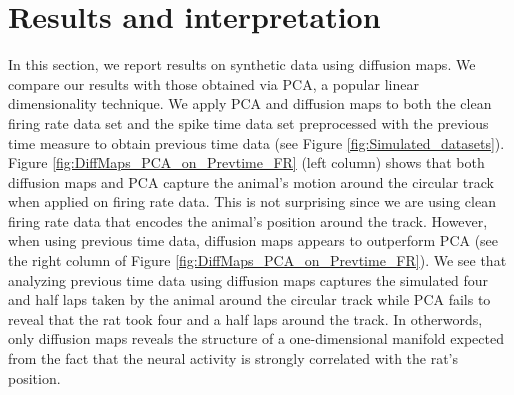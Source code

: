 
\section{Results and interpretation}
In this section, we report results on  synthetic data using diffusion maps. We compare our results with those obtained via PCA, a popular linear dimensionality technique. We apply PCA and diffusion maps to both the 
clean firing rate data set and the spike time data set preprocessed  with the previous time measure to obtain previous time data (see Figure \ref{fig:Simulated_datasets}).\\

Figure \ref{fig:DiffMaps_PCA_on_Prevtime_FR} (left column) shows that both diffusion maps  and PCA capture the animal's motion around the circular track when applied on firing rate data. This is not surprising since we are using clean firing rate data that encodes the animal's position around the track. However, when using previous time data, diffusion maps  appears to outperform PCA (see the right column of Figure  \ref{fig:DiffMaps_PCA_on_Prevtime_FR}). We  see that analyzing previous time data using diffusion maps captures the simulated four and half laps taken by the animal around the circular track while PCA  fails to reveal that the rat took four and a half laps  around the track. 
In otherwords, only diffusion maps  reveals the structure of a one-dimensional  manifold expected from the fact that 
the neural activity is strongly correlated with the rat's position.


